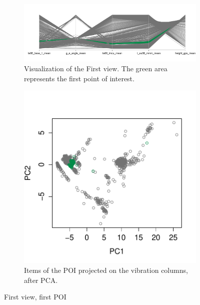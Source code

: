 \begin{figure}[t!]
        \centering
        \begin{subfigure}[b]{0.75\textwidth}
                \includegraphics[width=\textwidth]{images/vibration_group_1}
                \caption{Visualization of the First view. The green area
                represents the first point of interest.}
                \label{fig:vibration_group_1}
        \end{subfigure}%
        \begin{subfigure}[b]{0.25\textwidth}
                \includegraphics[width=\textwidth]{images/vibration_target_1}
                \caption{Items of the POI projected on the vibration columns,
                after PCA.}
                \label{fig:/vibration_target_2}
        \end{subfigure}
        \caption{First view, first POI}\label{fig:vibra-group1}
\end{figure}

